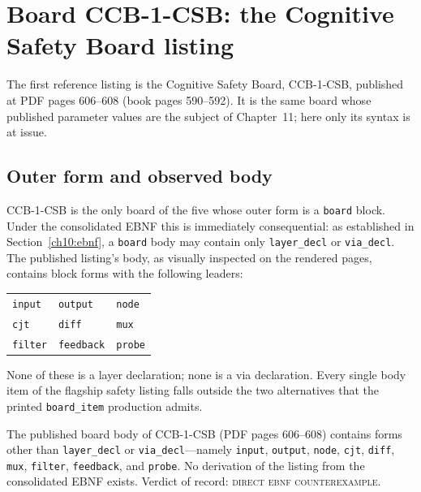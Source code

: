 \section{Board CCB-1-CSB: the Cognitive Safety Board listing}\label{ch10:ccb1}

The first reference listing is the Cognitive Safety Board, CCB-1-CSB, published at PDF pages 606--608 (book pages 590--592). It is the same board whose published parameter values are the subject of Chapter~11; here only its syntax is at issue.

\subsection{Outer form and observed body}

CCB-1-CSB is the only board of the five whose outer form is a \texttt{board} block. Under the consolidated EBNF this is immediately consequential: as established in Section~\ref{ch10:ebnf}, a \texttt{board} body may contain only \texttt{layer\_decl} or \texttt{via\_decl}. The published listing's body, as visually inspected on the rendered pages, contains block forms with the following leaders:

\begin{center}
\begin{tabular}{@{}lll@{}}
\toprule
\texttt{input} & \texttt{output} & \texttt{node} \\
\texttt{cjt} & \texttt{diff} & \texttt{mux} \\
\texttt{filter} & \texttt{feedback} & \texttt{probe} \\
\bottomrule
\end{tabular}
\end{center}

None of these is a layer declaration; none is a via declaration. Every single body item of the flagship safety listing falls outside the two alternatives that the printed \texttt{board\_item} production admits.

\begin{finding}\label{ch10:find-ccb1}
The published board body of CCB-1-CSB (PDF pages 606--608) contains forms other than \texttt{layer\_decl} or \texttt{via\_decl}---namely \texttt{input}, \texttt{output}, \texttt{node}, \texttt{cjt}, \texttt{diff}, \texttt{mux}, \texttt{filter}, \texttt{feedback}, and \texttt{probe}. No derivation of the listing from the consolidated EBNF exists. Verdict of record: \textsc{direct ebnf counterexample}.
\end{finding}

